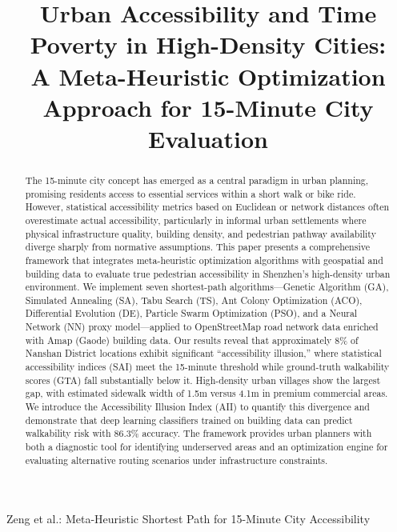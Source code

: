 \documentclass[journal]{IEEEtran}
\begin{document}

\title{Urban Accessibility and Time Poverty in High-Density Cities: \\
A Meta-Heuristic Optimization Approach for 15-Minute City Evaluation}

\author{
  \and
}

%
{Zeng et al.: Meta-Heuristic Shortest Path for 15-Minute City Accessibility}

\maketitle

\begin{abstract}
The 15-minute city concept has emerged as a central paradigm in urban planning, promising residents access to essential services within a short walk or bike ride. However, statistical accessibility metrics based on Euclidean or network distances often overestimate actual accessibility, particularly in informal urban settlements where physical infrastructure quality, building density, and pedestrian pathway availability diverge sharply from normative assumptions. This paper presents a comprehensive framework that integrates meta-heuristic optimization algorithms with geospatial and building data to evaluate true pedestrian accessibility in Shenzhen's high-density urban environment. We implement seven shortest-path algorithms---Genetic Algorithm (GA), Simulated Annealing (SA), Tabu Search (TS), Ant Colony Optimization (ACO), Differential Evolution (DE), Particle Swarm Optimization (PSO), and a Neural Network (NN) proxy model---applied to OpenStreetMap road network data enriched with Amap (Gaode) building data. Our results reveal that approximately 8\% of Nanshan District locations exhibit significant ``accessibility illusion,'' where statistical accessibility indices (SAI) meet the 15-minute threshold while ground-truth walkability scores (GTA) fall substantially below it. High-density urban villages show the largest gap, with estimated sidewalk width of 1.5m versus 4.1m in premium commercial areas. We introduce the Accessibility Illusion Index (AII) to quantify this divergence and demonstrate that deep learning classifiers trained on building data can predict walkability risk with 86.3\% accuracy. The framework provides urban planners with both a diagnostic tool for identifying underserved areas and an optimization engine for evaluating alternative routing scenarios under infrastructure constraints.
\end{abstract}
\end{document}
